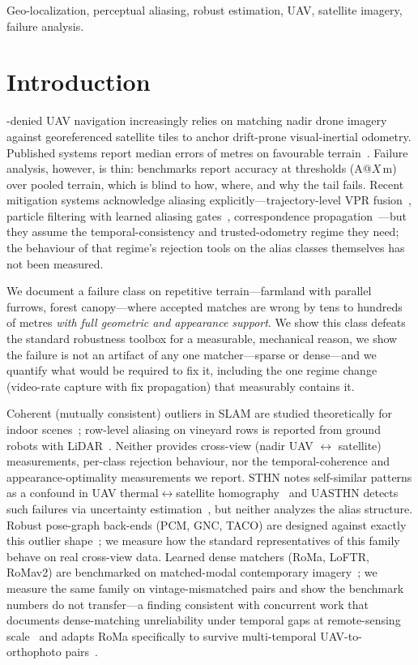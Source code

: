 \documentclass[journal]{IEEEtran}
\begin{document}
\begin{IEEEkeywords}
Geo-localization, perceptual aliasing, robust estimation, UAV, satellite imagery, failure analysis.
\end{IEEEkeywords}

\IEEEpeerreviewmaketitle

\section{Introduction}
-denied UAV navigation increasingly relies on matching nadir drone imagery against georeferenced satellite tiles to anchor drift-prone visual-inertial odometry. Published systems report median errors of metres on favourable terrain~\cite{anyvisloc,orthotrack,ortholoc}. Failure analysis, however, is thin: benchmarks report accuracy at thresholds (A@$X$\,m) over pooled terrain, which is blind to how, where, and why the tail fails. Recent mitigation systems acknowledge aliasing explicitly---trajectory-level VPR fusion~\cite{naviloc}, particle filtering with learned aliasing gates~\cite{cpfl}, correspondence propagation~\cite{orthotrack}---but they assume the temporal-consistency and trusted-odometry regime they need; the behaviour of that regime's rejection tools on the alias classes themselves has not been measured.

We document a failure class on repetitive terrain---farmland with parallel furrows, forest canopy---where accepted matches are wrong by tens to hundreds of metres \emph{with full geometric and appearance support}. We show this class defeats the standard robustness toolbox for a measurable, mechanical reason, we show the failure is not an artifact of any one matcher---sparse or dense---and we quantify what would be required to fix it, including the one regime change (video-rate capture with fix propagation) that measurably contains it.

Coherent (mutually consistent) outliers in SLAM are studied theoretically for indoor scenes~\cite{lajoie2019}; row-level aliasing on vineyard rows is reported from ground robots with LiDAR~\cite{desilva2026,desilva2025,tempovine}. Neither provides cross-view (nadir UAV $\leftrightarrow$ satellite) measurements, per-class rejection behaviour, nor the temporal-coherence and appearance-optimality measurements we report. STHN notes self-similar patterns as a confound in UAV thermal$\leftrightarrow$satellite homography~\cite{sthn} and UASTHN detects such failures via uncertainty estimation~\cite{uasthn}, but neither analyzes the alias structure. Robust pose-graph back-ends (PCM, GNC, TACO) are designed against exactly this outlier shape~\cite{mangelson2018,kimera,yang2020,taco}; we measure how the standard representatives of this family behave on real cross-view data. Learned dense matchers (RoMa, LoFTR, RoMav2) are benchmarked on matched-modal contemporary imagery~\cite{xianvisloc}; we measure the same family on vintage-mismatched pairs and show the benchmark numbers do not transfer---a finding consistent with concurrent work that documents dense-matching unreliability under temporal gaps at remote-sensing scale~\cite{loretta} and adapts RoMa specifically to survive multi-temporal UAV-to-orthophoto pairs~\cite{satroma}.
\end{document}
